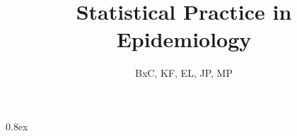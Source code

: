 \documentclass[12pt,dvipsnames,t,handout%
,aspectratio=169%
]{beamer}
\begin{document}
\parskip 0.8ex


\addtocounter{framenumber}{-1}
\begin{comment}
\begin{frame}[plain]
{\usebeamercolor[fg]{frametitle}
 \LARGE \bf Statistical Practice in Epidemiology with R}
\vfill
{\footnotesize
 \bf Bendix Carstensen\sf, Steno Diabetes Center, Copenhagen\\%
 \bf Krista Fischer\sf, Dept. of Biostatistics, University of Tartu\\%
 \bf Esa L??r?\sf, Unit of Math. Sciences, University of Oulu\\%
 \bf Janne Pitk?niemi\sf, Finnish Cancer Registry\\
 \bf Martyn Plummer\sf, IARC, Lyon\\%
}
\normalsize
\vfill
23 to 28 August, 2019\\
University of Tartu, Estonia
\end{frame}
\end{comment}

\title{Statistical Practice in Epidemiology}
\author{BxC, KF, EL, JP, MP}

\end{document}

